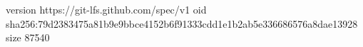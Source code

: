 version https://git-lfs.github.com/spec/v1
oid sha256:79d2383475a81b9e9bbce4152b6f91333cdd1e1b2ab5e336686576a8dae13928
size 87540
